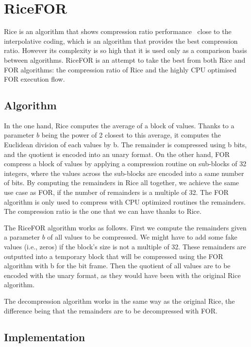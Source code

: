 \section{RiceFOR}{
Rice is an algorithm that shows compression ratio
performance~\cite{zhang:2008:www} close to the interpolative coding, which is
an algorithm that provides the best compression ratio. However its complexity
is so high that it is used only as a comparison basis between algorithms.
RiceFOR is an attempt to take the best from both Rice and FOR algorithms: the
compression ratio of Rice and the highly CPU optimised FOR execution flow.
}

\subsection{Algorithm}

In the one hand, Rice computes the average of a block of values. Thanks to a
parameter $b$ being the power of 2 closest to this average, it computes the
Euclidean division of each values by b. The remainder is compressed using b
bits, and the quotient is encoded into an unary format. On the other hand, FOR
compress a block of values by applying a compression routine on sub-blocks of
32 integers, where the values across the sub-blocks are encoded into a same
number of bits. By computing the remainders in Rice all together, we achieve the
same use case as FOR, if the number of remainders is a multiple of 32.
The FOR algorithm is only used to compress with CPU optimized routines the
remainders. The compression ratio is the one that we can have thanks to Rice.

The RiceFOR algorithm works as follows. First we compute the remainders given a
parameter $b$ of all values to be compressed. We might have to add some fake
values (i.e., zeros) if the block's size is not a multiple of 32. These
remainders are outputted into a temporary block that will be compressed using
the FOR algorithm with b for the bit frame. Then the quotient of all values
are to be encoded with the unary format, as they would have been with the
original Rice algorithm.

The decompression algorithm works in the same way as the original Rice, the
difference being that the remainders are to be decompressed with FOR.

\subsection{Implementation}

